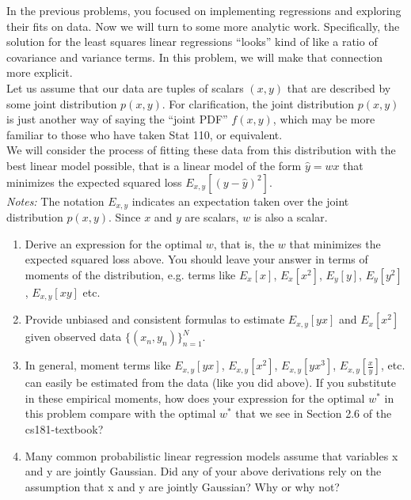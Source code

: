 \documentclass[submit]{harvardml}
\begin{document}
\newpage

\newpage
\begin{problem}

  In the previous problems, you focused on implementing regressions
  and exploring their fits on data. Now we will turn to some more
  analytic work.  Specifically, the solution for the least squares
  linear regressions ``looks'' kind of like a ratio of covariance and
  variance terms.  In this problem, we will make that connection more
  explicit. \\

  \noindent Let us assume that our data are tuples of scalars $(x,y)$ that are
  described by some joint distribution $p(x,y)$.  For clarification, the joint distribution $p(x,y)$ is just another way of saying the ``joint PDF'' $f(x,y)$, which may be more familiar to those who have taken Stat 110, or equivalent. \\
  
  \noindent We will consider the process of fitting these data from this distribution with the best linear model
  possible, that is a linear model of the form $\hat{y} = wx$ that
  minimizes the expected squared loss $E_{x,y}[ ( y - \hat{y} )^2
  ]$.\\

\noindent \emph{Notes:} The notation $E_{x, y}$ indicates an
expectation taken over the joint distribution $p(x,y)$.  Since $x$ and
$y$ are scalars, $w$ is also a scalar.
  
  \begin{enumerate}

  \item Derive an expression for the optimal $w$, that is, the $w$
    that minimizes the expected squared loss above.  You should leave
    your answer in terms of moments of the distribution, e.g. terms
    like $E_x[x]$, $E_x[x^2]$, $E_y[y]$, $E_y[y^2]$, $E_{x,y}[xy]$
    etc.

\item Provide unbiased and consistent formulas to estimate $E_{x, y}[yx]$
 and $E_x[x^2]$ given observed data $\{(x_n,y_n)\}_{n=1}^N$.

\item In general, moment terms like $E_{x, y}[yx]$, $E_{x, y}[x^2]$,
  $E_{x, y}[yx^3]$, $E_{x, y}[\frac{x}{y}]$, etc. can easily be
  estimated from the data (like you did above).  If you substitute in
  these empirical moments, how does your expression for the optimal
  $w^*$ in this problem compare with the optimal $w^*$ that we see in
  Section 2.6 of the cs181-textbook?

\item Many common probabilistic linear regression models assume that
  variables x and y are jointly Gaussian.  Did any of your above
  derivations rely on the assumption that x and y are jointly
  Gaussian?  Why or why not?
    
\end{enumerate}
  
\end{problem}
\end{document}
